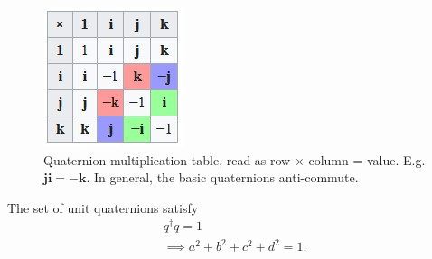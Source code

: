 \documentclass[11pt]{article}
\numberwithin{equation}{section}
\begin{document}
\begin{figure}
\begin{center}
\includegraphics[width=0.2\columnwidth]{figures/quaternion-multiplication.jpg}  
\end{center}
\caption{Quaternion multiplication table, read as row $\times$ column = value. E.g. $\mathbf{ji}=-\mathbf{k}$. In general, the basic quaternions anti-commute.}
\label{fig:quaternion-multiplication}
\end{figure}


The set of unit quaternions satisfy
\begin{align}
q^\dagger q = 1 \\
\implies a^2 + b^2 + c^2 + d^2 = 1.
\end{align}

\newpage
 
\end{document}
